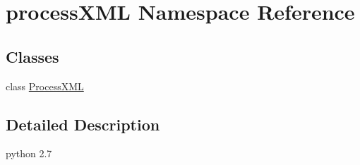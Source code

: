 \hypertarget{namespaceprocess_x_m_l}{}\section{process\+X\+M\+L Namespace Reference}
\label{namespaceprocess_x_m_l}
\subsection*{Classes}
\begin{DoxyCompactItemize}
\item 
class \hyperlink{classprocess_x_m_l_1_1_process_x_m_l}{Process\+X\+M\+L}
\end{DoxyCompactItemize}


\subsection{Detailed Description}
\begin{DoxyVerb}python 2.7 \end{DoxyVerb}
 